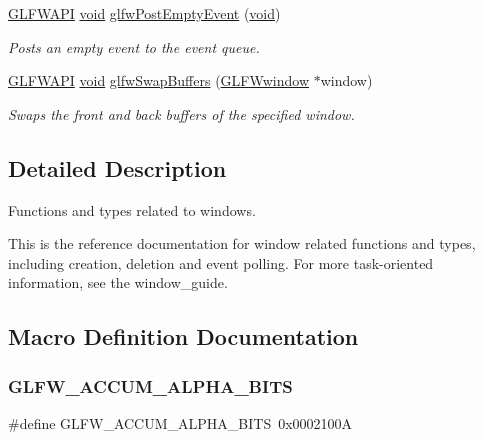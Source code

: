\begin{DoxyCompactItemize}
\mbox{\hyperlink{glfw3_8h_a56da5036b2cc259351ae22fd6439bb47}{G\+L\+F\+W\+A\+PI}} \mbox{\hyperlink{glad_8h_a950fc91edb4504f62f1c577bf4727c29}{void}} \mbox{\hyperlink{group__window_gad6f6b997278c91c43b35970eb9713d7e}{glfw\+Post\+Empty\+Event}} (\mbox{\hyperlink{glad_8h_a950fc91edb4504f62f1c577bf4727c29}{void}})
\begin{DoxyCompactList}\small\item\em Posts an empty event to the event queue. \end{DoxyCompactList}\item 
\mbox{\hyperlink{glfw3_8h_a56da5036b2cc259351ae22fd6439bb47}{G\+L\+F\+W\+A\+PI}} \mbox{\hyperlink{glad_8h_a950fc91edb4504f62f1c577bf4727c29}{void}} \mbox{\hyperlink{group__window_gafb827800eedbfcbc97b1e5408df668d7}{glfw\+Swap\+Buffers}} (\mbox{\hyperlink{group__window_ga3c96d80d363e67d13a41b5d1821f3242}{G\+L\+F\+Wwindow}} $\ast$window)
\begin{DoxyCompactList}\small\item\em Swaps the front and back buffers of the specified window. \end{DoxyCompactList}\end{DoxyCompactItemize}


\subsection{Detailed Description}
Functions and types related to windows. 

This is the reference documentation for window related functions and types, including creation, deletion and event polling. For more task-\/oriented information, see the window\+\_\+guide. 

\subsection{Macro Definition Documentation}
\mbox{\label{group__window_gae829b55591c18169a40ab4067a041b1f}} 
\subsubsection{\texorpdfstring{GLFW\_ACCUM\_ALPHA\_BITS}{GLFW\_ACCUM\_ALPHA\_BITS}}
{\footnotesize\ttfamily \#define G\+L\+F\+W\+\_\+\+A\+C\+C\+U\+M\+\_\+\+A\+L\+P\+H\+A\+\_\+\+B\+I\+TS~0x0002100A}



